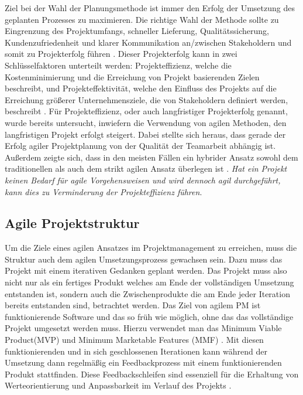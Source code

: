 Ziel bei der Wahl der Planungsmethode ist immer den Erfolg der Umsetzung des geplanten Prozesses zu maximieren.
Die richtige Wahl der Methode sollte zu Eingrenzung des Projektumfangs, schneller Lieferung, Qualitätssicherung, Kundenzufriedenheit und klarer Kommunikation an/zwischen Stakeholdern und somit zu Projekterfolg führen \cite{systemsApproachToPlanningSchedulingAndControlling}.
Dieser Projekterfolg kann in zwei Schlüsselfaktoren unterteilt werden: Projekteffizienz, welche die Kostenminimierung und die Erreichung von Projekt basierenden Zielen beschreibt, und Projekteffektivität, welche den Einfluss des Projekts auf die Erreichung größerer Unternehmensziele, die von Stakeholdern definiert werden, beschreibt \cite{relationshipBetweenProjectSuccessAndProjectEfficiency}.
Für Projekteffizienz, oder auch langfristiger Projekterfolg genannt, wurde bereits untersucht, inwiefern die Verwendung von agilen Methoden, den langfristigen Projekt erfolgt steigert. Dabei stellte sich heraus, dass gerade der Erfolg agiler Projektplanung von der Qualität der Teamarbeit abhängig ist.
Außerdem zeigte sich, dass in den meisten Fällen ein hybrider Ansatz sowohl dem traditionellen als auch dem strikt agilen Ansatz überlegen ist \cite{traditionalAndAgileOnProjectSuccess}.
\emph{Hat ein Projekt keinen Bedarf für agile Vorgehensweisen und wird dennoch agil durchgeführt, kann dies zu Verminderung der Projekteffizienz führen}.

\subsection{Agile Projektstruktur}
Um die Ziele eines agilen Ansatzes im Projektmanagement zu erreichen, muss die Struktur auch dem agilen Umsetzungsprozess gewachsen sein. Dazu muss das Projekt mit einem iterativen Gedanken geplant werden. Das Projekt muss also nicht nur als ein fertiges Produkt welches am Ende der vollständigen Umsetzung entstanden ist, sondern auch die Zwischenprodukte die am Ende jeder Iteration bereits entstanden sind, betrachtet werden. Das Ziel von agilem PM ist funktionierende Software und das so früh wie möglich, ohne das das vollständige Projekt umgesetzt werden muss. Hierzu verwendet man das Minimum Viable Product(MVP) und Minimum Marketable Features (MMF) \cite{agilesProjektmanagementImBerufsalltagMVPundMMF}.  Mit diesen funktionierenden und in sich geschlossenen Iterationen kann während der Umsetzung dann regelmäßig ein Feedbackprozess mit einem funktionierenden Produkt stattfinden. Diese Feedbackschleifen sind essenziell für die Erhaltung von Werteorientierung und Anpassbarkeit im Verlauf des Projekts \cite{}.

